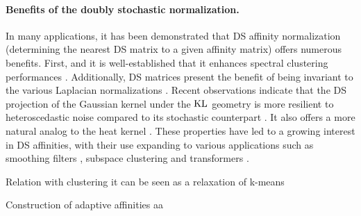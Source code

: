 \paragraph{Benefits of the doubly stochastic normalization.}
In many applications, it has been demonstrated that DS affinity normalization (\ie determining the nearest DS matrix to a given affinity matrix) offers numerous benefits. First, and it is well-established that it enhances spectral clustering performances \citep{Ding_understand,Zass,beauchemin2015affinity}. Additionally, DS matrices present the benefit of being invariant to the various Laplacian normalizations \citep{von2007tutorial}. Recent observations indicate that the DS projection of the Gaussian kernel under the $\operatorname{KL}$ geometry is more resilient to heteroscedastic noise compared to its stochastic counterpart \citep{landa2021doubly}. It also offers a more natural analog to the heat kernel \citep{marshall2019manifold}.
These properties have led to a growing interest in DS affinities, with their use expanding to various applications such as smoothing filters \citep{Milanfar}, subspace clustering \citep{lim2020doubly} and transformers \citep{sander2022sinkformers}.

\begin{remark}{Relation with clustering}
    it can be seen as a relaxation of k-means \citep{zass2005unifying}
\end{remark}

\vspace{0.5cm}
\begin{prob}{Construction of adaptive affinities}
    aa
\end{prob}
\vspace{0.5cm}
